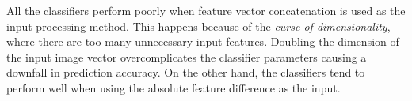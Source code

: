 All the classifiers perform poorly when feature vector concatenation is used
as the input processing method. This happens because of the \emph{curse of
dimensionality}, where there are too many unnecessary input features. Doubling
the dimension of the input image vector overcomplicates the classifier
parameters causing a downfall in prediction accuracy. On the other hand,
the classifiers tend to perform well when using the absolute feature
difference as the input.

